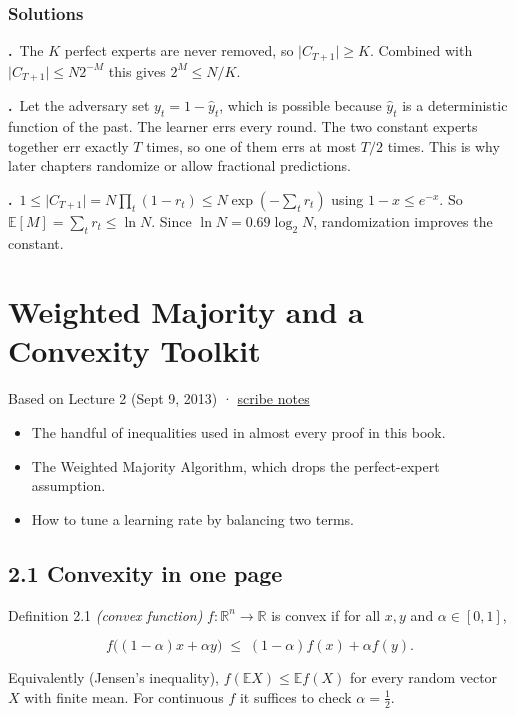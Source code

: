 \documentclass[11pt,a4paper,openany]{book}
\newcommand{\R}{\mathbb{R}}
\newcommand{\E}{\mathbb{E}}
\newcommand{\abs}[1]{\lvert #1\rvert}
\newcommand{\hy}{\hat{y}}
\newcommand{\chapsource}[1]{{\small\sffamily\color{muted}#1\par}\medskip}
\newenvironment{solutions}{\small}{}
\newcommand{\sol}[2]{\par\smallskip\noindent\textbf{\sffamily #1.}\ #2\par}
\begin{document}
\subsection*{Solutions}
\begin{solutions}
\sol{1.1}{The $K$ perfect experts are never removed, so $\abs{C_{T+1}}\ge K$. Combined with $\abs{C_{T+1}}\le N2^{-M}$ this gives $2^M\le N/K$.}
\sol{1.2}{Let the adversary set $y_t=1-\hy_t$, which is possible because $\hy_t$ is a deterministic function of the past. The learner errs every round. The two constant experts together err exactly $T$ times, so one of them errs at most $T/2$ times. This is why later chapters randomize or allow fractional predictions.}
\sol{1.3}{$1\le \abs{C_{T+1}} = N\prod_t(1-r_t)\le N\exp(-\sum_t r_t)$ using $1-x\le e^{-x}$. So $\E[M]=\sum_t r_t\le\ln N$. Since $\ln N = 0.69\log_2N$, randomization improves the constant.}
\end{solutions}

\chapter[Weighted Majority]{Weighted Majority and a Convexity Toolkit}\label{ch2}
\chapsource{Based on Lecture 2 (Sept 9, 2013) · \href{https://web.eecs.umich.edu/~jabernet/eecs598course/fall2013/web/notes/lec2_090913.pdf}{scribe notes}}

\begin{goals}
\begin{itemize}
\item The handful of inequalities used in almost every proof in this book.
\item The Weighted Majority Algorithm, which drops the perfect-expert assumption.
\item How to tune a learning rate by balancing two terms.
\end{itemize}
\end{goals}

\section*{2.1 Convexity in one page}\label{ch2-convex}

\begin{bdef}{Definition 2.1 \emph{(convex function)}}
$f:\R^n\to\R$ is convex if for all $x,y$ and $\alpha\in[0,1]$,

\[f\big((1-\alpha)x+\alpha y\big)\;\le\;(1-\alpha)f(x)+\alpha f(y).\]

Equivalently (Jensen's inequality), $f(\E X)\le\E f(X)$ for every random vector $X$ with finite mean. For continuous $f$ it suffices to check $\alpha=\tfrac12$.
\end{bdef}
\end{document}
